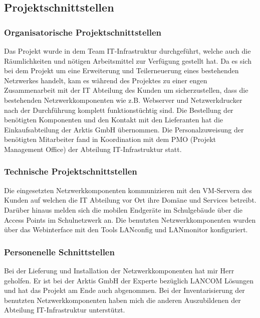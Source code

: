\subsection{Projektschnittstellen} 
\label{sec:Projektschnittstellen}
\subsubsection{Organisatorische Projektschnittstellen}
Das Projekt wurde in dem Team IT-Infrastruktur durchgeführt, welche auch die Räumlichkeiten und nötigen Arbeitsmittel zur Verfügung gestellt hat. Da es sich bei dem Projekt um eine Erweiterung und Teilerneuerung eines bestehenden Netzwerkes handelt, kam es während des Projektes zu einer engen Zusammenarbeit mit der IT Abteilung des Kunden um sicherzustellen, dass die bestehenden Netzwerkkomponenten wie z.B. Webserver und Netzwerkdrucker nach der Durchführung komplett funktionstüchtig sind. Die Bestellung der benötigten Komponenten und den Kontakt mit den Lieferanten hat die Einkaufsabteilung der Arktis GmbH übernommen. Die Personalzuweisung der benötigten Mitarbeiter fand in Koordination mit dem PMO (Projekt Management Office) der Abteilung IT-Infrastruktur statt.    
\subsubsection{Technische Projektschnittstellen}
Die eingesetzten Netzwerkkomponenten kommunizieren mit den VM-Servern des Kunden auf welchen die IT Abteilung vor Ort ihre Domäne und Services betreibt. Darüber hinaus melden sich die mobilen Endgeräte im Schulgebäude über die Access Points im Schulnetzwerk an. Die benutzten Netzwerkkomponenten wurden über das Webinterface mit den Tools LANconfig und LANmonitor konfiguriert.
\subsubsection{Personenelle Schnittstellen}
Bei der Lieferung und Installation der Netzwerkkomponenten hat mir Herr  geholfen. Er ist bei der Arktis GmbH der Experte bezüglich LANCOM Lösungen und hat das Projekt am Ende auch abgenommen. Bei der Inventarisierung der benutzten Netzwerkkomponenten haben mich die anderen Auszubildenen der Abteilung IT-Infrastruktur unterstützt. 
\begin{comment}
	\item Mit welchen anderen Systemen interagiert die Anwendung (technische Schnittstellen)?
	\item Wer genehmigt das Projekt \bzw stellt Mittel zur Verfügung? 
	\item Wer sind die Benutzer der Anwendung?
	\item Wem muss das Ergebnis präsentiert werden?
\end{comment}


